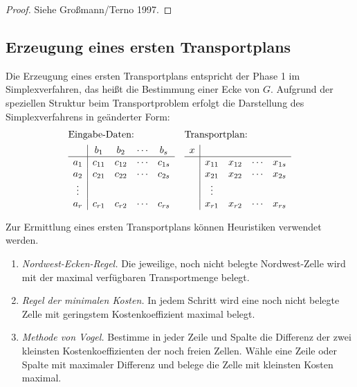 \begin{proof}
  Siehe Großmann/Terno 1997.
\end{proof}

\subsection{Erzeugung eines ersten Transportplans}
Die Erzeugung eines ersten Transportplans entspricht der Phase 1 im
Simplexverfahren, das heißt die Bestimmung einer Ecke von $G$. Aufgrund der
speziellen Struktur beim Transportproblem erfolgt die Darstellung des
Simplexverfahrens in geänderter Form:
\begin{align*}
  &\text{Eingabe-Daten:} &
  &\text{Transportplan:} \\
  &\begin{array}{c|cccc}
    & b_1 & b_2 & \cdots & b_s \\
    \hline
    a_1 & c_{11} & c_{12} & \cdots & c_{1s} \\
    a_2 & c_{21} & c_{22} & \cdots & c_{2s} \\
    \vdots \\
    a_r & c_{r1} & c_{r2} & \cdots & c_{rs}
  \end{array}
  &
  &\begin{array}{c|cccc}
    x &  \\
    \hline
     & x_{11} & x_{12} & \cdots & x_{1s} \\
     & x_{21} & x_{22} & \cdots & x_{2s} \\
     & \vdots \\
     & x_{r1} & x_{r2} & \cdots & x_{rs}
  \end{array}
\end{align*}

Zur Ermittlung eines ersten Transportplans können Heuristiken verwendet werden.
\begin{enumerate}
\item \emph{Nordwest-Ecken-Regel.} Die jeweilige, noch nicht belegte
  Nordwest-Zelle wird mit der maximal verfügbaren Transportmenge belegt.
\item \emph{Regel der minimalen Kosten.} In jedem Schritt wird eine noch nicht
  belegte Zelle mit geringstem Kostenkoeffizient maximal belegt.
\item \emph{Methode von Vogel.} Bestimme in jeder Zeile und Spalte die Differenz
  der zwei kleinsten Kostenkoeffizienten der noch freien Zellen. Wähle eine
  Zeile oder Spalte mit maximaler Differenz und belege die Zelle mit kleinsten
  Kosten maximal.
\end{enumerate}

